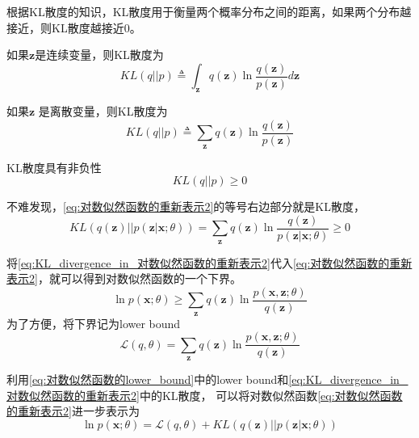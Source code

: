 \documentclass[withoutpreface,bwprint]{NoteBook}
\begin{document}
根据KL散度的知识，KL散度用于衡量两个概率分布之间的距离，如果两个分布越接近，则KL散度越接近0。

如果$\mathbf{z} $是连续变量，则KL散度为
\begin{equation}
    \label{eq:KL_divergence_between_q_and_p_if_z_is_continuous}
    KL(q||p) \triangleq  \int_{\mathbf{z}} q(\mathbf{z}) \ln \frac{q(\mathbf{z})}{p(\mathbf{z})} d\mathbf{z} 
\end{equation}

如果$\mathbf{z}$ 是离散变量，则KL散度为
\begin{equation}
    \label{eq:KL_divergence_between_q_and_p_if_z_is_discrete}
    KL(q||p) \triangleq  \sum_{\mathbf{z}} q(\mathbf{z}) \ln \frac{q(\mathbf{z})}{p(\mathbf{z})} 
\end{equation}

KL散度具有非负性
$$
    KL(q||p) \geq 0
$$

不难发现，\cref{eq:对数似然函数的重新表示2}的等号右边部分就是KL散度，
\begin{equation}
    \label{eq:KL_divergence_in_对数似然函数的重新表示2}
    KL(q(\mathbf{z})||p(\mathbf{z}|\mathbf{x};\theta)) = \sum_{\mathbf{z}} q(\mathbf{z}) \ln \frac{q(\mathbf{z})}{p(\mathbf{z}|\mathbf{x};\theta)} \geq 0 
\end{equation}

将\cref{eq:KL_divergence_in_对数似然函数的重新表示2}代入\cref{eq:对数似然函数的重新表示2}，就可以得到对数似然函数的一个下界。
\begin{equation}
    \label{eq:对数似然函数的下界}
    \ln p(\mathbf{x};\theta) \geq \sum_{\mathbf{z}} q(\mathbf{z}) \ln \frac{p(\mathbf{x},\mathbf{z};\theta)}{q(\mathbf{z})}
\end{equation}
为了方便，将下界记为lower bound
\begin{equation}
    \label{eq:对数似然函数的lower_bound}
    \mathcal{L}(q,\theta) = \sum_{\mathbf{z}} q(\mathbf{z}) \ln \frac{p(\mathbf{x},\mathbf{z};\theta)}{q(\mathbf{z})}
\end{equation}

利用\cref{eq:对数似然函数的lower_bound}中的lower bound和\cref{eq:KL_divergence_in_对数似然函数的重新表示2}中的KL散度，
可以将对数似然函数\cref{eq:对数似然函数的重新表示2}进一步表示为
\begin{equation}
    \label{eq:对数似然函数用lower_bound和KL_divergence表示}
    \ln p(\mathbf{x};\theta) = \mathcal{L}(q,\theta) + KL(q(\mathbf{z})||p(\mathbf{z}|\mathbf{x};\theta))
\end{equation}
\end{document}
